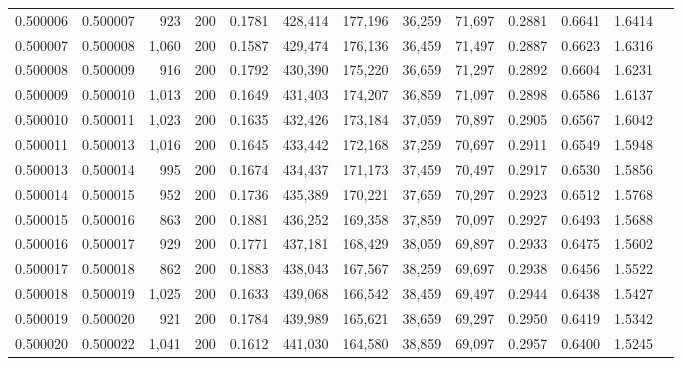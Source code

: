 \begin{tabular}{rrrrrrrrrrrrr}
0.500006 & 0.500007 &    923 & 200 &                                     0.1781 & 428,414 & 177,196 &  36,259 &  71,697 & 0.2881 & 0.6641 & 1.6414 \\
0.500007 & 0.500008 &  1,060 & 200 &                                     0.1587 & 429,474 & 176,136 &  36,459 &  71,497 & 0.2887 & 0.6623 & 1.6316 \\
0.500008 & 0.500009 &    916 & 200 &                                     0.1792 & 430,390 & 175,220 &  36,659 &  71,297 & 0.2892 & 0.6604 & 1.6231 \\
0.500009 & 0.500010 &  1,013 & 200 &                                     0.1649 & 431,403 & 174,207 &  36,859 &  71,097 & 0.2898 & 0.6586 & 1.6137 \\
0.500010 & 0.500011 &  1,023 & 200 &                                     0.1635 & 432,426 & 173,184 &  37,059 &  70,897 & 0.2905 & 0.6567 & 1.6042 \\
0.500011 & 0.500013 &  1,016 & 200 &                                     0.1645 & 433,442 & 172,168 &  37,259 &  70,697 & 0.2911 & 0.6549 & 1.5948 \\
0.500013 & 0.500014 &    995 & 200 &                                     0.1674 & 434,437 & 171,173 &  37,459 &  70,497 & 0.2917 & 0.6530 & 1.5856 \\
0.500014 & 0.500015 &    952 & 200 &                                     0.1736 & 435,389 & 170,221 &  37,659 &  70,297 & 0.2923 & 0.6512 & 1.5768 \\
0.500015 & 0.500016 &    863 & 200 &                                     0.1881 & 436,252 & 169,358 &  37,859 &  70,097 & 0.2927 & 0.6493 & 1.5688 \\
0.500016 & 0.500017 &    929 & 200 &                                     0.1771 & 437,181 & 168,429 &  38,059 &  69,897 & 0.2933 & 0.6475 & 1.5602 \\
0.500017 & 0.500018 &    862 & 200 &                                     0.1883 & 438,043 & 167,567 &  38,259 &  69,697 & 0.2938 & 0.6456 & 1.5522 \\
0.500018 & 0.500019 &  1,025 & 200 &                                     0.1633 & 439,068 & 166,542 &  38,459 &  69,497 & 0.2944 & 0.6438 & 1.5427 \\
0.500019 & 0.500020 &    921 & 200 &                                     0.1784 & 439,989 & 165,621 &  38,659 &  69,297 & 0.2950 & 0.6419 & 1.5342 \\
0.500020 & 0.500022 &  1,041 & 200 &                                     0.1612 & 441,030 & 164,580 &  38,859 &  69,097 & 0.2957 & 0.6400 & 1.5245 \\

\end{tabular}
